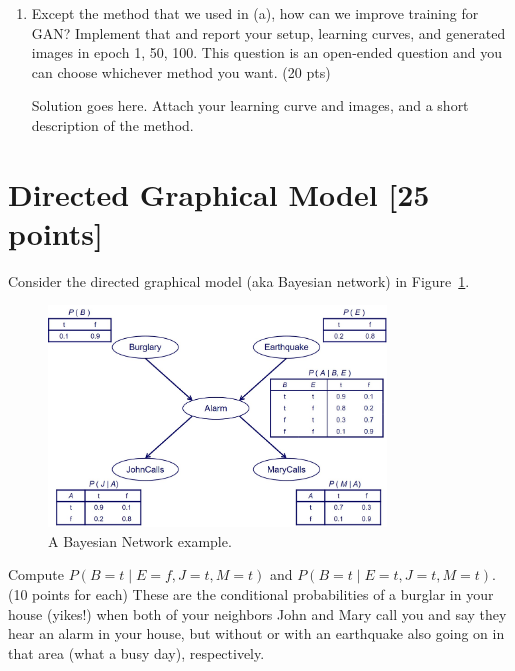 \documentclass[a4paper]{article}
\theoremstyle{definition}
\newenvironment{soln}{
	\leavevmode\color{blue}\ignorespaces
}{}
\begin{document}
\begin{enumerate} [label=(\alph*)]
		\begin{soln}  Solution goes here. Attach your learning curve and images. \end{soln}
		
		\item Except the method that we used in (a), how can we improve training for GAN? Implement that and report your setup, learning curves, and generated images in epoch 1, 50, 100.
        This question is an open-ended question and you can choose whichever method you want.
		\hfill (20 pts)
		
		\begin{soln}  Solution goes here. Attach your learning curve and images, and a short description of the method. \end{soln}
		
	\end{enumerate}

\section{Directed Graphical Model [25 points]}
Consider the directed graphical model (aka Bayesian network) in Figure~\ref{fig:bn}.
\begin{figure}[H]
    \centering
    \includegraphics[width=0.8\textwidth]{BN.jpeg}
    \caption{A Bayesian Network example.}
    \label{fig:bn}
\end{figure}
Compute $P(B=t \mid E=f,J=t,M=t)$ and $P(B=t \mid E=t,J=t,M=t)$. (10 points for each) These are the conditional probabilities of a burglar in your house (yikes!) when both of your neighbors John and Mary call you and say they hear an alarm in your house, but without or with an earthquake also going on in that area (what a busy day), respectively.
\end{document}
